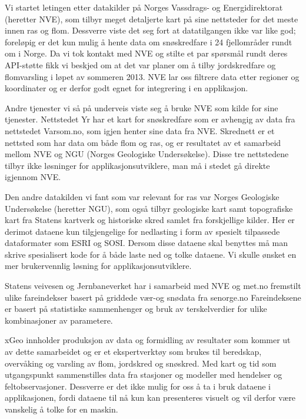 \documentclass[a4paper,norsk,oneside]{book}
\begin{document}
Vi startet letingen etter datakilder på Norges Vassdrags- og Energidirektorat (heretter NVE), som tilbyr meget detaljerte kart på sine nettsteder for det meste innen ras og flom.\cite{nve}  Dessverre viste det seg fort at datatilgangen ikke var like god; foreløpig er det kun mulig å hente data om snøskredfare i 24 fjellområder rundt om i Norge. Da vi tok kontakt med NVE og stilte et par spørsmål rundt deres API-støtte fikk vi beskjed om at det var planer om å tilby jordskredfare og flomvarsling i løpet av sommeren 2013. NVE lar oss filtrere data etter regioner og koordinater og er derfor godt egnet for integrering i en applikasjon.

Andre tjenester vi så på underveis viste seg å bruke NVE som kilde for sine tjenester. Nettstedet Yr har et kart for snøskredfare som er avhengig av data fra nettstedet Varsom.no, som igjen henter sine data fra NVE.\cite{varsom} Skrednett \cite{skred} er et nettsted som har data om både flom og ras, og er resultatet av et samarbeid mellom NVE og NGU (Norges Geologiske Undersøkelse)\cite{ngu}. Disse tre nettstedene tilbyr ikke løsninger for applikasjonsutviklere, man må i stedet gå direkte igjennom NVE.

Den andre datakilden vi fant som var relevant for ras var Norges Geologiske Undersøkelse (heretter NGU), som også tilbyr geologiske kart samt topografiske kart fra Statens kartverk og historiske skred samlet fra forskjellige kilder. Her er derimot dataene kun tilgjengelige for nedlasting i form av spesielt tilpassede dataformater som ESRI og SOSI.  Dersom disse dataene skal benyttes må man skrive spesialisert kode for å både laste ned og tolke dataene. Vi skulle ønsket en mer brukervennlig løsning for applikasjonsutviklere.

Statens veivesen og Jernbaneverket har i samarbeid med NVE og met.no fremstilt ulike fareindekser basert på griddede vær-og snødata fra senorge.no
Fareindeksene er basert på statistiske sammenhenger og bruk av terskelverdier for ulike kombinasjoner av parametere. 

xGeo innholder produksjon av data og formidling av resultater som kommer ut av dette samarbeidet og er et ekspertverktøy som brukes til beredskap, overvåking og varsling av flom, jordskred og snøskred.\cite{xgeo} Med kart og tid som utgangspunkt sammenstilles data fra stasjoner og modeller med hendelser og feltobservasjoner. Dessverre er det ikke mulig for oss å ta i bruk dataene i applikasjonen, fordi dataene til nå kun kan presenteres visuelt og vil derfor være vanskelig å tolke for en maskin.
\end{document}
